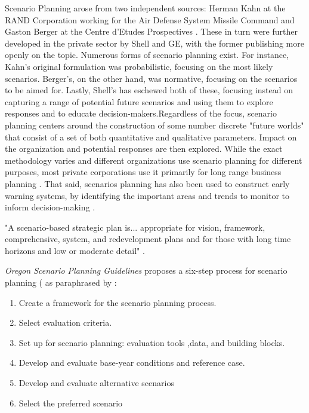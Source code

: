 Scenario Planning arose from two independent sources: Herman Kahn at the RAND Corporation working for the Air Defense System Missile Command and Gaston Berger at the Centre d'Etudes Prospectives \cite{bradfieldOriginsEvolutionScenario2005}. These in turn were further developed in the private sector by Shell and GE, with the former publishing more openly on the topic. Numerous forms of scenario planning exist. For instance, Kahn's original formulation was probabilistic, focusing on the most likely scenarios. Berger's, on the other hand, was normative, focusing on the scenarios to be aimed for. Lastly, Shell's has eschewed both of these, focusing instead on capturing a range of potential future scenarios and using them to explore responses and to educate decision-makers.Regardless of the focus, scenario planning centers around the construction of some number discrete "future worlds" that consist of a set of both quantitative and qualitative parameters. Impact on the organization and potential responses are then explored. While the exact methodology varies and different organizations use scenario planning for different purposes, most private corporations use it primarily for long range business planning \cite{bradfieldOriginsEvolutionScenario2005}. That said, scenarios planning has also been used to construct early warning systems, by identifying the important areas and trends to monitor to inform decision-making \cite{tessunScenarioAnalysisEarly1997}.

"A scenario-based strategic plan is... appropriate for vision, framework, comprehensive, system, and redevelopment plans and for those with long time horizons and low or moderate detail" \cite{goodspeedScenarioPlanningCities2020}. 

\textit{Oregon Scenario Planning Guidelines} proposes a six-step process for scenario planning ( \cite{oregonsustainabletransportationinitiativeScenarioPlanningGuidelines2017} as paraphrased by \cite{goodspeedScenarioPlanningCities2020}:

\begin{enumerate}[itemsep=0pt,parsep=0pt]
	\item{Create a framework for the scenario planning process.}
	\item{Select evaluation criteria.}
	\item{Set up for scenario planning: evaluation tools ,data, and building blocks.}
	\item{Develop and evaluate base-year conditions and reference case.}
	\item{Develop and evaluate alternative scenarios}
	\item{Select the preferred scenario}
\end{enumerate}

